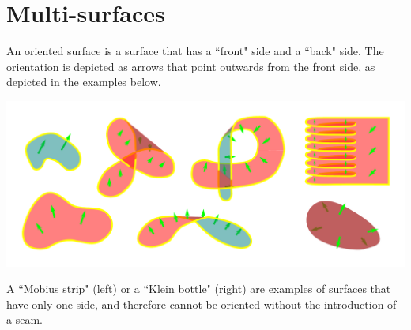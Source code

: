 \section{Multi-surfaces}

An oriented surface is a surface that has a ``front" side and a ``back" side. The orientation is depicted as arrows that point outwards from the front side, as depicted in the examples below.

\begin{center}
\includegraphics[scale = 0.7]{Multi-structures/Multisurfaces/oriented_surfaces}
\end{center}

A ``Mobius strip" (left) or a ``Klein bottle" (right) are examples of surfaces that have only one side, and therefore cannot be oriented without the introduction of a seam. 

